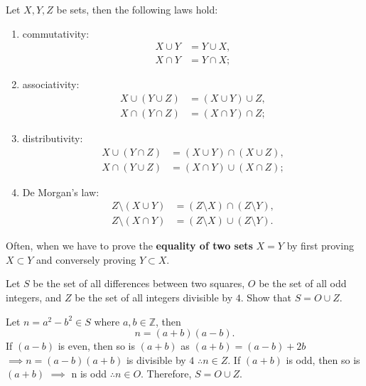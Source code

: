 \begin{lemma}
    Let $X,Y,Z$ be sets, then the following laws hold:
    \begin{enumerate}
        \item commutativity:
        \begin{align*}
            X\cup Y&=Y\cup X,\\
            X\cap Y&=Y\cap X;
        \end{align*}
        
        \item associativity:
        \begin{align*}
            X\cup(Y\cup Z)&=(X\cup Y)\cup Z,\\
            X\cap(Y\cap Z)&=(X\cap Y)\cap Z;
        \end{align*}
        
        \item distributivity:
        \begin{align*}
            X\cup(Y\cap Z)&=(X\cup Y)\cap(X\cup Z),\\
            X\cap(Y\cup Z)&=(X\cap Y)\cup(X\cap Z);
        \end{align*}
        
        \item De Morgan's law:
        \begin{align*}
            Z\setminus(X\cup Y)&=(Z\setminus X)\cap(Z\setminus Y),\\
            Z\setminus(X\cap Y)&=(Z\setminus X)\cup(Z\setminus Y).
        \end{align*}
    \end{enumerate}
\end{lemma}

Often, when we have to prove the \textbf{equality of two sets} $X=Y$ by first proving $X\subset Y$ and conversely proving $Y\subset X$.

\begin{example}
    Let $S$ be the set of all differences between two squares, $O$ be the set of all odd integers, and $Z$ be the set of all integers divisible by $4$. Show that $S=O\cup Z$.
    
    Let $n=a^2-b^2\in S$ where $a,b\in\mathbb Z$, then
    \[n=(a+b)(a-b).\]
    If $(a-b)$ is even, then so is $(a+b)$ as $(a+b)=(a-b)+2b$ $\implies n=(a-b)(a+b)$ is divisible by $4$ $\therefore n\in Z$. If $(a+b)$ is odd, then so is $(a+b)$ $\implies$ n is odd $\therefore n\in O$. Therefore, $S=O\cup Z$.
\end{example}


